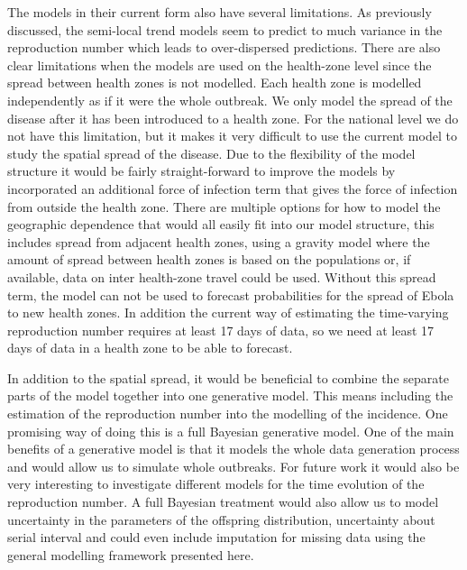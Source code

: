 \documentclass[12pt]{article}
\begin{document}
The models in their current form also have several limitations. As previously discussed, the semi-local trend models seem to predict to much variance in the reproduction number which leads to over-dispersed predictions. There are also clear limitations when the models are used on the health-zone level since the spread between health zones is not modelled. Each health zone is modelled independently as if it were the whole outbreak. We only model the spread of the disease after it has been introduced to a health zone. For the national level we do not have this limitation, but it makes it very difficult to use the current model to study the spatial spread of the disease. Due to the flexibility of the model structure it would be fairly straight-forward to improve the models by incorporated an additional force of infection term that gives the force of infection from outside the health zone. There are multiple options for how to model the geographic dependence that would all easily fit into our model structure, this includes spread from adjacent health zones, using a gravity model where the amount of spread between health zones is based on the populations \cite{haynesGravitySpatialInteraction1985} or, if available, data on inter health-zone travel could be used. Without this spread term, the model can not be used to forecast probabilities for the spread of Ebola to new health zones. In addition the current way of estimating the time-varying reproduction number requires at least 17 days of data, so we need at least 17 days of data in a health zone to be able to forecast.

In addition to the spatial spread, it would be beneficial to combine the separate parts of the model together into one generative model. This means including the estimation of the reproduction number into the modelling of the incidence. One promising way of doing this is a full Bayesian generative model. One of the main benefits of a generative model is that it models the whole data generation process and would allow us to simulate whole outbreaks. For future work it would also be very interesting to investigate different models for the time evolution of the reproduction number. A full Bayesian treatment would also allow us to model uncertainty in the parameters of the offspring distribution, uncertainty about serial interval and could even include imputation for missing data using the general modelling framework presented here.
\end{document}
